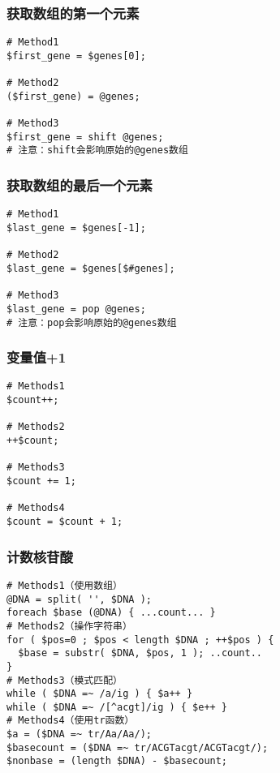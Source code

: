 \begin{frame}[fragile]
  \frametitle{获取数组的第一个元素}
\begin{lstlisting}
# Method1
$first_gene = $genes[0];

# Method2
($first_gene) = @genes;

# Method3
$first_gene = shift @genes;
# 注意：shift会影响原始的@genes数组
\end{lstlisting}
\end{frame}

\begin{frame}[fragile]
  \frametitle{获取数组的最后一个元素}
\begin{lstlisting}
# Method1
$last_gene = $genes[-1];

# Method2
$last_gene = $genes[$#genes];

# Method3
$last_gene = pop @genes;
# 注意：pop会影响原始的@genes数组
\end{lstlisting}
\end{frame}

\begin{frame}[fragile]
  \frametitle{变量值+1}
\begin{lstlisting}
# Methods1
$count++;

# Methods2
++$count;

# Methods3
$count += 1;

# Methods4
$count = $count + 1;
\end{lstlisting}
\end{frame}

\begin{frame}[fragile]
  \frametitle{计数核苷酸}
\begin{lstlisting}
# Methods1（使用数组）
@DNA = split( '', $DNA );
foreach $base (@DNA) { ...count... }
# Methods2（操作字符串）
for ( $pos=0 ; $pos < length $DNA ; ++$pos ) {
  $base = substr( $DNA, $pos, 1 ); ..count..
}
# Methods3（模式匹配）
while ( $DNA =~ /a/ig ) { $a++ }
while ( $DNA =~ /[^acgt]/ig ) { $e++ }
# Methods4（使用tr函数）
$a = ($DNA =~ tr/Aa/Aa/);
$basecount = ($DNA =~ tr/ACGTacgt/ACGTacgt/);
$nonbase = (length $DNA) - $basecount;
\end{lstlisting}
\end{frame}


